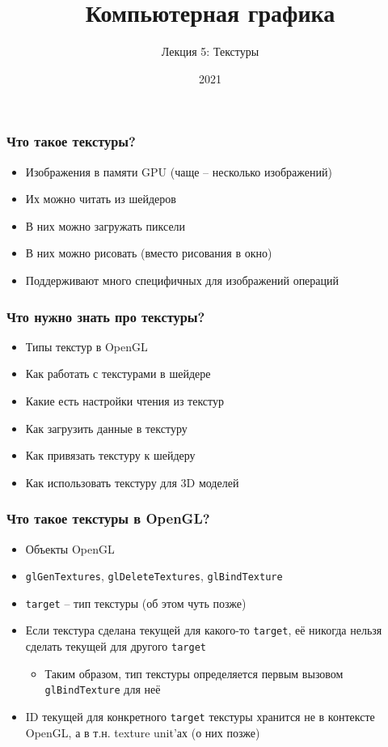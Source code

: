 \documentclass{beamer}
\title{Компьютерная графика}
\subtitle{Лекция 5: Текстуры}
\date{2021}
\begin{document}
\frame{\titlepage}

\begin{frame}[fragile]
\frametitle{Что такое текстуры?}
\begin{itemize}
\item Изображения в памяти GPU (чаще -- несколько изображений)
\pause
\item Их можно читать из шейдеров
\pause
\item В них можно загружать пиксели
\pause
\item В них можно рисовать (вместо рисования в окно)
\pause
\item Поддерживают много специфичных для изображений операций
\end{itemize}
\end{frame}

\begin{frame}[fragile]
\frametitle{Что нужно знать про текстуры?}
\begin{itemize}
\item Типы текстур в OpenGL
\pause
\item Как работать с текстурами в шейдере
\pause
\item Какие есть настройки чтения из текстур
\pause
\item Как загрузить данные в текстуру
\pause
\item Как привязать текстуру к шейдеру
\pause
\item Как использовать текстуру для 3D моделей
\end{itemize}
\end{frame}

\begin{frame}[fragile]
\frametitle{Что такое текстуры в OpenGL?}
\begin{itemize}
\item Объекты OpenGL
\pause
\item \verb|glGenTextures|, \verb|glDeleteTextures|, \verb|glBindTexture|
\pause
\item \verb|target| -- тип текстуры (об этом чуть позже)
\pause
\item Если текстура сделана текущей для какого-то \verb|target|, её никогда нельзя сделать текущей для другого \verb|target|
\begin{itemize}
\item Таким образом, тип текстуры определяется первым вызовом \verb|glBindTexture| для неё
\end{itemize}
\pause
\item ID текущей для конкретного \verb|target| текстуры хранится не в контексте OpenGL, а в т.н. texture unit'ах (о них позже)
\end{itemize}
\end{frame}
\end{document}
